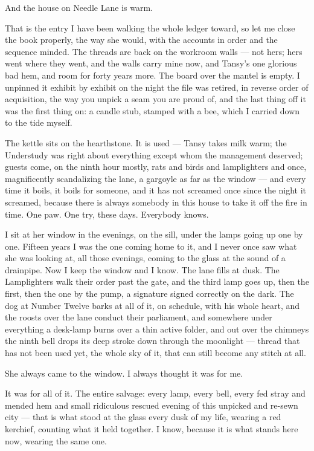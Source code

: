 And the house on Needle Lane is warm.

That is the entry I have been walking the whole ledger toward, so let me close the book properly, the way she would, with the accounts in order and the sequence minded. The threads are back on the workroom walls --- not hers; hers went where they went, and the walls carry mine now, and Tansy's one glorious bad hem, and room for forty years more. The board over the mantel is empty. I unpinned it exhibit by exhibit on the night the file was retired, in reverse order of acquisition, the way you unpick a seam you are proud of, and the last thing off it was the first thing on: a candle stub, stamped with a bee, which I carried down to the tide myself.

The kettle sits on the hearthstone. It is used --- Tansy takes milk warm; the Understudy was right about everything except whom the management deserved; guests come, on the ninth hour mostly, rats and birds and lamplighters and once, magnificently scandalizing the lane, a gargoyle as far as the window --- and every time it boils, it boils for someone, and it has not screamed once since the night it screamed, because there is always somebody in this house to take it off the fire in time. One paw. One try, these days. Everybody knows.

I sit at her window in the evenings, on the sill, under the lamps going up one by one. Fifteen years I was the one coming home to it, and I never once saw what she was looking at, all those evenings, coming to the glass at the sound of a drainpipe. Now I keep the window and I know. The lane fills at dusk. The Lamplighters walk their order past the gate, and the third lamp goes up, then the first, then the one by the pump, a signature signed correctly on the dark. The dog at Number Twelve barks at all of it, on schedule, with his whole heart, and the roosts over the lane conduct their parliament, and somewhere under everything a desk-lamp burns over a thin active folder, and out over the chimneys the ninth bell drops its deep stroke down through the moonlight --- thread that has not been used yet, the whole sky of it, that can still become any stitch at all.

She always came to the window. I always thought it was for me.

It was for all of it. The entire salvage: every lamp, every bell, every fed stray and mended hem and small ridiculous rescued evening of this unpicked and re-sewn city --- that is what stood at the glass every dusk of my life, wearing a red kerchief, counting what it held together. I know, because it is what stands here now, wearing the same one.

